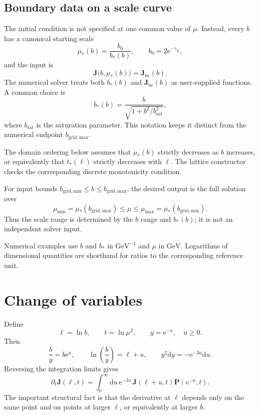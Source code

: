 \documentclass[11pt]{article}
\newcommand{\dd}{\mathrm{d}}
\newcommand{\ee}{\mathrm{e}}
\newcommand{\Jvec}{\bm J}
\newcommand{\Pmat}{\bm P}
\newcommand{\bzero}{b_0}
\begin{document}
\subsection{Boundary data on a scale curve}

The initial condition is not specified at one common value of \(\mu\).
Instead, every \(b\) has a canonical starting scale
\begin{equation}
  \mu_*(b)=\frac{\bzero}{b_*(b)},
  \qquad
  \bzero=2\ee^{-\gamma_E},
  \label{eq:canonical-scale}
\end{equation}
and the input is
\begin{equation}
  \Jvec\bigl(b,\mu_*(b)\bigr)
  =
  \Jvec_{\mathrm{bc}}(b).
  \label{eq:boundary-value}
\end{equation}
The numerical solver treats both \(b_*(b)\) and
\(\Jvec_{\mathrm{bc}}(b)\) as user-supplied functions. A common choice is
\begin{equation}
  b_*(b)
  =
  \frac{b}{\sqrt{1+b^2/b_{\mathrm{sat}}^2}},
  \label{eq:bstar-example}
\end{equation}
where \(b_{\mathrm{sat}}\) is the saturation parameter. This notation keeps
it distinct from the numerical endpoint \(b_{\mathrm{grid,max}}\).

The domain ordering below assumes that \(\mu_*(b)\) strictly decreases as
\(b\) increases, or equivalently that \(t_*(\ell)\) strictly decreases with
\(\ell\). The lattice constructor checks the corresponding discrete
monotonicity condition.

For input bounds
\(b_{\mathrm{grid,min}}\le b\le b_{\mathrm{grid,max}}\), the desired output
is the full solution over
\begin{equation}
  \mu_{\min}=\mu_*(b_{\mathrm{grid,max}})
  \le \mu \le
  \mu_{\max}=\mu_*(b_{\mathrm{grid,min}}).
  \label{eq:mu-domain}
\end{equation}
Thus the scale range is determined by the \(b\) range and \(b_*(b)\); it is
not an independent solver input.

Numerical examples use \(b\) and \(b_*\) in \(\mathrm{GeV}^{-1}\) and \(\mu\)
in \(\mathrm{GeV}\). Logarithms of dimensional quantities are shorthand for
ratios to the corresponding reference unit.

\section{Change of variables}

Define
\begin{equation}
  \ell=\ln b,
  \qquad
  t=\ln\mu^2,
  \qquad
  y=\ee^{-u},
  \quad u\ge0.
  \label{eq:variables}
\end{equation}
Then
\[
  \frac{b}{y}=b\ee^u,
  \qquad
  \ln\left(\frac{b}{y}\right)=\ell+u,
  \qquad
  y^2\dd y=-\ee^{-3u}\dd u.
\]
Reversing the integration limits gives
\begin{equation}
  \partial_t\Jvec(\ell,t)
  =
  \int_0^\infty\dd u\,\ee^{-3u}\,
  \Jvec(\ell+u,t)\Pmat(\ee^{-u},t).
  \label{eq:transformed-rg}
\end{equation}
The important structural fact is that the derivative at \(\ell\) depends
only on the same point and on points at larger \(\ell\), or equivalently at
larger \(b\).
\end{document}
